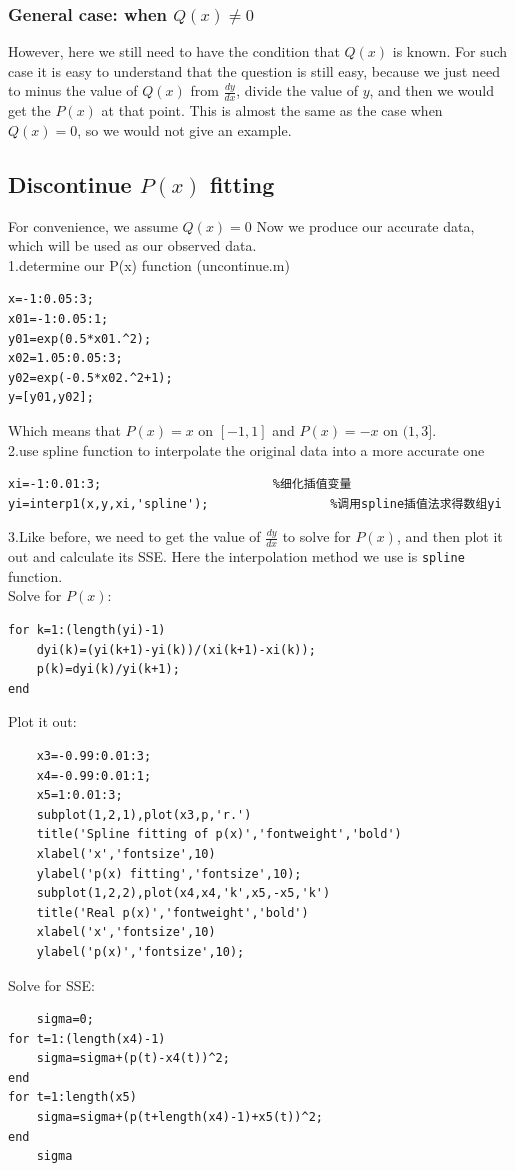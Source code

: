 \documentclass[a4paper]{article}
\begin{document}
\subsubsection{General case: when $Q(x) \ne 0$}
However, here we still need to have the condition that $Q(x)$ is known. For such case it is easy to understand that the question is still easy, because we just need to minus the value of $Q(x)$ from $\frac{{dy}}{{dx}}$, divide the value of $y$, and then we would get the $P(x)$ at that point. This is almost the same as the case when $Q(x)=0$, so we would not give an example.
\subsection{Discontinue $P(x)$ fitting}
For convenience, we assume $Q(x)=0$
Now we produce our accurate data, which will be used as our observed data.\\
1.determine our P(x) function (uncontinue.m)
\begin{verbatim}
x=-1:0.05:3;
x01=-1:0.05:1;
y01=exp(0.5*x01.^2);
x02=1.05:0.05:3;
y02=exp(-0.5*x02.^2+1);
y=[y01,y02];
\end{verbatim}
Which means that $P(x)=x$ on $[-1,1]$ and $P(x)=-x$ on $(1,3]$.\\
2.use spline function to interpolate the original data into a more accurate one
\begin{verbatim}
xi=-1:0.01:3;                        %细化插值变量
yi=interp1(x,y,xi,'spline');                 %调用spline插值法求得数组yi
\end{verbatim}
3.Like before, we need to get the value of $\frac{{dy}}{{dx}}$ to solve for $P(x)$, and then plot it out and calculate its SSE. Here the interpolation method we use is \verb$spline$ function.\\
Solve for $P(x)$:
\begin{verbatim}
for k=1:(length(yi)-1)
    dyi(k)=(yi(k+1)-yi(k))/(xi(k+1)-xi(k));
    p(k)=dyi(k)/yi(k+1);
end
\end{verbatim}
Plot it out:
\begin{verbatim}
    x3=-0.99:0.01:3;
    x4=-0.99:0.01:1;
    x5=1:0.01:3;
    subplot(1,2,1),plot(x3,p,'r.')
    title('Spline fitting of p(x)','fontweight','bold')
    xlabel('x','fontsize',10)
    ylabel('p(x) fitting','fontsize',10);
    subplot(1,2,2),plot(x4,x4,'k',x5,-x5,'k')
    title('Real p(x)','fontweight','bold')
    xlabel('x','fontsize',10)
    ylabel('p(x)','fontsize',10);
\end{verbatim}
Solve for SSE:
\begin{verbatim}
    sigma=0;
for t=1:(length(x4)-1)
    sigma=sigma+(p(t)-x4(t))^2;
end
for t=1:length(x5)
    sigma=sigma+(p(t+length(x4)-1)+x5(t))^2;
end
    sigma
\end{verbatim}
\end{document}
